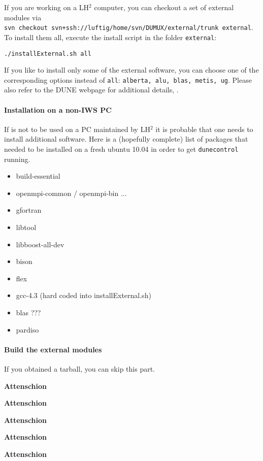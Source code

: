If you are working on a LH$^2$ computer, you can checkout a set of external modules via \\
\texttt{svn checkout svn+ssh://luftig/home/svn/DUMUX/external/trunk external}. \\
To install them all, execute the install script in the folder \texttt{external}:
\begin{center}
\texttt{./installExternal.sh all}
\end{center}
If you like to install only some of the external software, you can choose one of the 
corresponding options instead of \texttt{all}: \texttt{alberta, alu, blas, metis, ug}.
Please also refer to the DUNE webpage for additional details, \cite{DUNE-HP}. 


\paragraph{Installation on a non-IWS PC}
If \Dumux is not to be used on a PC maintained by LH$^2$ it is probable that one needs to install additional software. 
Here is a (hopefully complete) list of packages that needed to  be installed on a fresh ubuntu 10.04 in order to get \verb+dunecontrol+ running.
\begin{itemize}
  \item build-essential
  \item openmpi-common / openmpi-bin ...
  \item gfortran
  \item libtool
  \item libboost-all-dev
  \item bison
  \item flex
  \item gcc-4.3 (hard coded into installExternal.sh)
  \item blas ???
  \item pardiso
\end{itemize}


\paragraph{Build the external modules} 
If you obtained a \Dumux tarball, you can skip this part. 

\begin{turn}{45}\textbf{Attenschion}\end{turn}
\begin{turn}{45}\textbf{Attenschion}\end{turn}
\begin{turn}{45}\textbf{Attenschion}\end{turn}
\begin{turn}{45}\textbf{Attenschion}\end{turn}
\begin{turn}{45}\textbf{Attenschion}\end{turn}

